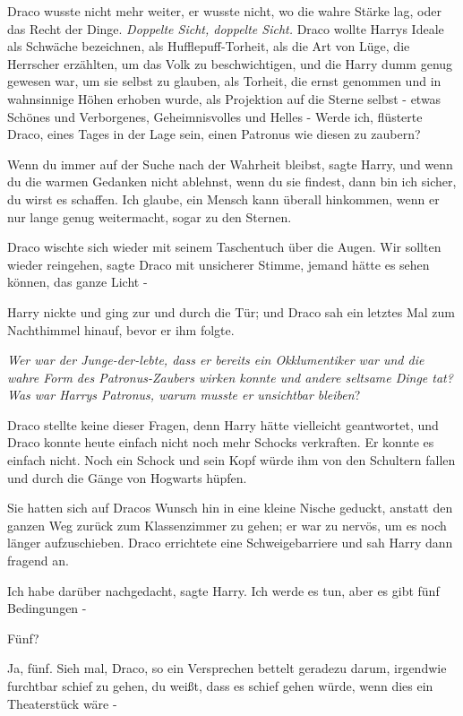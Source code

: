 Draco wusste nicht mehr weiter, er wusste nicht, wo die wahre Stärke lag, oder
das Recht der Dinge. \emph{Doppelte Sicht, doppelte Sicht.} Draco wollte Harrys
Ideale als Schwäche bezeichnen, als Hufflepuff-Torheit, als die Art von Lüge,
die Herrscher erzählten, um das Volk zu beschwichtigen, und die Harry dumm genug
gewesen war, um sie selbst zu glauben, als Torheit, die ernst genommen und in
wahnsinnige Höhen erhoben wurde, als Projektion auf die Sterne selbst - etwas
Schönes und Verborgenes, Geheimnisvolles und Helles - \glqq{}Werde ich\grqq{},
flüsterte Draco, \glqq{}eines Tages in der Lage sein, einen Patronus wie diesen
zu zaubern?\grqq{}

\glqq{}Wenn du immer auf der Suche nach der Wahrheit bleibst\grqq{}, sagte Harry,
\glqq{}und wenn du die warmen Gedanken nicht ablehnst, wenn du sie findest, dann
bin ich sicher, du wirst es schaffen. Ich glaube, ein Mensch kann überall
hinkommen, wenn er nur lange genug weitermacht, sogar zu den Sternen.\grqq{}

Draco wischte sich wieder mit seinem Taschentuch über die Augen. \glqq{}Wir
sollten wieder reingehen\grqq{}, sagte Draco mit unsicherer Stimme, \glqq{}jemand
hätte es sehen können, das ganze Licht -\grqq{}

Harry nickte und ging zur und durch die Tür; und Draco sah ein letztes Mal zum
Nachthimmel hinauf, bevor er ihm folgte.

\emph{Wer war der Junge-der-lebte, dass er bereits ein Okklumentiker war und die
wahre Form des Patronus-Zaubers wirken konnte und andere seltsame Dinge tat? Was
war Harrys Patronus, warum musste er unsichtbar bleiben}?

Draco stellte keine dieser Fragen, denn Harry hätte vielleicht geantwortet, und
Draco konnte heute einfach nicht noch mehr Schocks verkraften. Er konnte es
einfach nicht. Noch ein Schock und sein Kopf würde ihm von den Schultern fallen
und durch die Gänge von Hogwarts hüpfen.

Sie hatten sich auf Dracos Wunsch hin in eine kleine Nische geduckt, anstatt den
ganzen Weg zurück zum Klassenzimmer zu gehen; er war zu nervös, um es noch
länger aufzuschieben. Draco errichtete eine Schweigebarriere und sah Harry dann
fragend an.

\glqq{}Ich habe darüber nachgedacht\grqq{}, sagte Harry. \glqq{}Ich werde es tun,
aber es gibt fünf Bedingungen -\grqq{}

\glqq{}Fünf?\grqq{}

\glqq{}Ja, fünf. Sieh mal, Draco, so ein Versprechen bettelt geradezu darum,
irgendwie furchtbar schief zu gehen, du weißt, dass es schief gehen würde, wenn
dies ein Theaterstück wäre -\grqq{}

